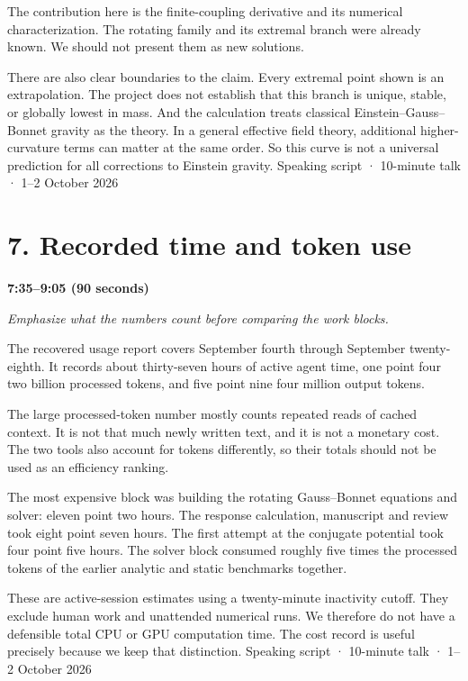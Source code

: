 \documentclass[12pt,a4paper]{article}
\begin{document}
The contribution here is the finite-coupling derivative and its numerical characterization. The rotating family and its extremal branch were already known. We should not present them as new solutions.

There are also clear boundaries to the claim. Every extremal point shown is an extrapolation. The project does not establish that this branch is unique, stable, or globally lowest in mass. And the calculation treats classical Einstein--Gauss--Bonnet gravity as the theory. In a general effective field theory, additional higher-curvature terms can matter at the same order. So this curve is not a universal prediction for all corrections to Einstein gravity.
\newpage
{\small Speaking script · 10-minute talk · 1--2 October 2026}\par
\section*{7. Recorded time and token use}
\textbf{7:35--9:05 (90 seconds)}\par
{\itshape Emphasize what the numbers count before comparing the work blocks.}\par\medskip
The recovered usage report covers September fourth through September twenty-eighth. It records about thirty-seven hours of active agent time, one point four two billion processed tokens, and five point nine four million output tokens.

The large processed-token number mostly counts repeated reads of cached context. It is not that much newly written text, and it is not a monetary cost. The two tools also account for tokens differently, so their totals should not be used as an efficiency ranking.

The most expensive block was building the rotating Gauss--Bonnet equations and solver: eleven point two hours. The response calculation, manuscript and review took eight point seven hours. The first attempt at the conjugate potential took four point five hours. The solver block consumed roughly five times the processed tokens of the earlier analytic and static benchmarks together.

These are active-session estimates using a twenty-minute inactivity cutoff. They exclude human work and unattended numerical runs. We therefore do not have a defensible total CPU or GPU computation time. The cost record is useful precisely because we keep that distinction.
\newpage
{\small Speaking script · 10-minute talk · 1--2 October 2026}\par
\end{document}
